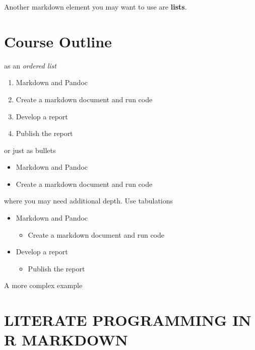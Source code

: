 \documentclass[
]{article}
\providecommand{\tightlist}{%
  \setlength{\itemsep}{0pt}\setlength{\parskip}{0pt}}
\begin{document}
Another markdown element you may want to use are \textbf{lists}.

\hypertarget{course-outline}{%
\section{Course Outline}\label{course-outline}}

as an \emph{ordered list}

\begin{enumerate}
\def\labelenumi{\arabic{enumi}.}
\tightlist
\item
  Markdown and Pandoc
\item
  Create a markdown document and run code
\item
  Develop a report
\item
  Publish the report
\end{enumerate}

or just as bullets

\begin{itemize}
\tightlist
\item
  Markdown and Pandoc
\item
  Create a markdown document and run code
\end{itemize}

where you may need additional depth. Use tabulations

\begin{itemize}
\tightlist
\item
  Markdown and Pandoc

  \begin{itemize}
  \tightlist
  \item
    Create a markdown document and run code
  \end{itemize}
\item
  Develop a report

  \begin{itemize}
  \tightlist
  \item
    Publish the report
  \end{itemize}
\end{itemize}

A more complex example

\hypertarget{literate-programming-in-r-markdown}{%
\section{LITERATE PROGRAMMING IN R MARKDOWN}\label{literate-programming-in-r-markdown}}
\end{document}
